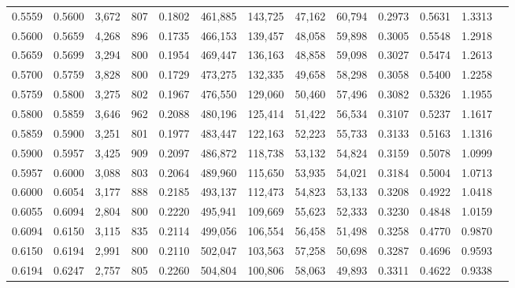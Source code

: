 \begin{tabular}{rrrrrrrrrrrrr}
0.5559 & 0.5600 &  3,672 &   807 &                                     0.1802 & 461,885 & 143,725 &  47,162 &  60,794 & 0.2973 & 0.5631 & 1.3313 \\
0.5600 & 0.5659 &  4,268 &   896 &                                     0.1735 & 466,153 & 139,457 &  48,058 &  59,898 & 0.3005 & 0.5548 & 1.2918 \\
0.5659 & 0.5699 &  3,294 &   800 &                                     0.1954 & 469,447 & 136,163 &  48,858 &  59,098 & 0.3027 & 0.5474 & 1.2613 \\
0.5700 & 0.5759 &  3,828 &   800 &                                     0.1729 & 473,275 & 132,335 &  49,658 &  58,298 & 0.3058 & 0.5400 & 1.2258 \\
0.5759 & 0.5800 &  3,275 &   802 &                                     0.1967 & 476,550 & 129,060 &  50,460 &  57,496 & 0.3082 & 0.5326 & 1.1955 \\
0.5800 & 0.5859 &  3,646 &   962 &                                     0.2088 & 480,196 & 125,414 &  51,422 &  56,534 & 0.3107 & 0.5237 & 1.1617 \\
0.5859 & 0.5900 &  3,251 &   801 &                                     0.1977 & 483,447 & 122,163 &  52,223 &  55,733 & 0.3133 & 0.5163 & 1.1316 \\
0.5900 & 0.5957 &  3,425 &   909 &                                     0.2097 & 486,872 & 118,738 &  53,132 &  54,824 & 0.3159 & 0.5078 & 1.0999 \\
0.5957 & 0.6000 &  3,088 &   803 &                                     0.2064 & 489,960 & 115,650 &  53,935 &  54,021 & 0.3184 & 0.5004 & 1.0713 \\
0.6000 & 0.6054 &  3,177 &   888 &                                     0.2185 & 493,137 & 112,473 &  54,823 &  53,133 & 0.3208 & 0.4922 & 1.0418 \\
0.6055 & 0.6094 &  2,804 &   800 &                                     0.2220 & 495,941 & 109,669 &  55,623 &  52,333 & 0.3230 & 0.4848 & 1.0159 \\
0.6094 & 0.6150 &  3,115 &   835 &                                     0.2114 & 499,056 & 106,554 &  56,458 &  51,498 & 0.3258 & 0.4770 & 0.9870 \\
0.6150 & 0.6194 &  2,991 &   800 &                                     0.2110 & 502,047 & 103,563 &  57,258 &  50,698 & 0.3287 & 0.4696 & 0.9593 \\
0.6194 & 0.6247 &  2,757 &   805 &                                     0.2260 & 504,804 & 100,806 &  58,063 &  49,893 & 0.3311 & 0.4622 & 0.9338 \\

\end{tabular}
